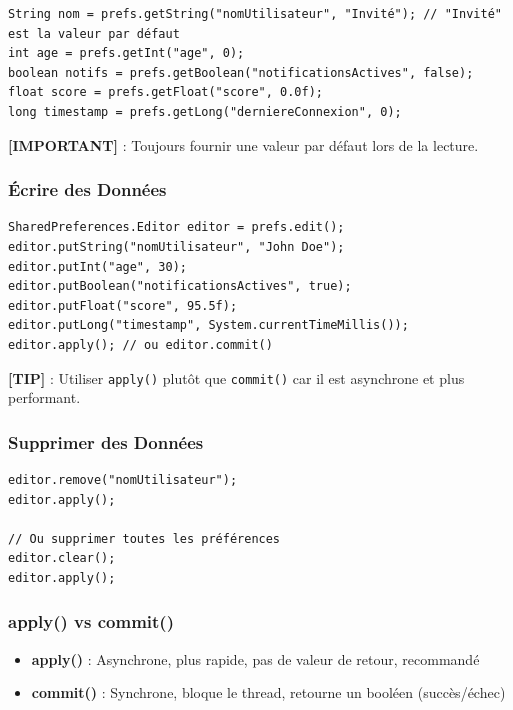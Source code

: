 \documentclass[11pt,a4paper]{article}
\begin{document}
\begin{lstlisting}
String nom = prefs.getString("nomUtilisateur", "Invité"); // "Invité" est la valeur par défaut
int age = prefs.getInt("age", 0);
boolean notifs = prefs.getBoolean("notificationsActives", false);
float score = prefs.getFloat("score", 0.0f);
long timestamp = prefs.getLong("derniereConnexion", 0);
\end{lstlisting}

\textbf{[IMPORTANT]} : Toujours fournir une valeur par défaut lors de la lecture.

\subsubsection{Écrire des Données}

\begin{lstlisting}
SharedPreferences.Editor editor = prefs.edit();
editor.putString("nomUtilisateur", "John Doe");
editor.putInt("age", 30);
editor.putBoolean("notificationsActives", true);
editor.putFloat("score", 95.5f);
editor.putLong("timestamp", System.currentTimeMillis());
editor.apply(); // ou editor.commit()
\end{lstlisting}

\textbf{[TIP]} : Utiliser \texttt{apply()} plutôt que \texttt{commit()} car il est asynchrone et plus performant.

\subsubsection{Supprimer des Données}

\begin{lstlisting}
editor.remove("nomUtilisateur");
editor.apply();

// Ou supprimer toutes les préférences
editor.clear();
editor.apply();
\end{lstlisting}

\subsubsection{apply() vs commit()}

\begin{itemize}
    \item \textbf{apply()} : Asynchrone, plus rapide, pas de valeur de retour, recommandé
    \item \textbf{commit()} : Synchrone, bloque le thread, retourne un booléen (succès/échec)
\end{itemize}
\end{document}
